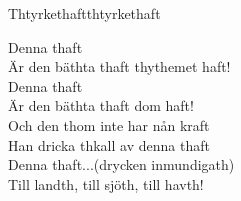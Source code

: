 \begin{song}{Thtyrkethaft}{thtyrkethaft}
\begin{vers}
Denna thaft\\
Är den bäthta thaft thythemet haft!\\
Denna thaft\\
Är den bäthta thaft dom haft!\\
Och den thom inte har nån kraft\\
Han dricka thkall av denna thaft\\
Denna thaft...(drycken inmundigath)\\
Till landth, till sjöth, till havth!\\
\end{vers}
\end{song}
